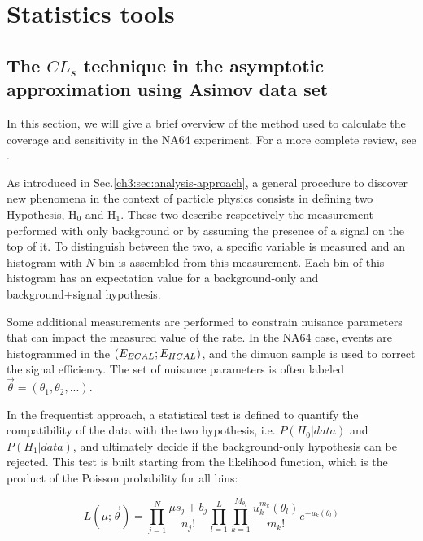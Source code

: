 
\chapter{Statistics tools}

\label{AppendixE}

\section{The $CL_s$ technique in the asymptotic approximation using Asimov data set}

In this section, we will give a brief overview of the method used to calculate the coverage and sensitivity in the NA64 experiment. For a more complete review, see \cite{Read_2002,JUNK1999435,Cowan:2010js}.

As introduced in Sec.\ref{ch3:sec:analysis-approach}, a general procedure to discover new phenomena in the context of particle physics consists in defining two Hypothesis, H$_0$ and H$_1$. These two describe respectively the measurement performed with only background or by assuming the presence of a signal on the top of it. To distinguish between the two, a specific variable is measured and an histogram with $N$ bin is assembled from this measurement. Each bin of this histogram has an expectation value for a background-only and background+signal hypothesis.

Some additional measurements are performed to constrain nuisance parameters that can impact the measured value of the rate. In the NA64 case, events are histogrammed in the $(E_{ECAL};E_{HCAL})$, and the dimuon sample is used to correct the signal efficiency. The set of nuisance parameters is often labeled $\vec{\theta} = (\theta_1, \theta_2, ...)$.

In the frequentist approach, a statistical test is defined to quantify the compatibility of the data with the two hypothesis, i.e. $P(H_0 | data)$ and $P(H_1 | data)$, and ultimately decide if the background-only hypothesis can be rejected. This test is built starting from the likelihood function, which is the product of the Poisson probability for all bins:

\begin{equation}
  \label{eq:likelihood}
  L(\mu; \vec{\theta}) = \prod_{j=1}^N \frac{\mu s_j + b_j}{n_j!} \prod_{l=1}^{L}\prod_{k=1}^{M_{\theta_l}}\frac{u^{m_k}_k(\theta_l)}{m_k!} e^{-u_k(\theta_l)}
\end{equation}

